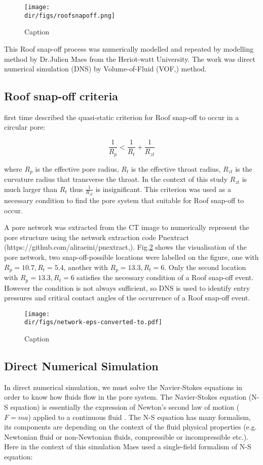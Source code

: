\begin{figure}
    \centering
    \texttt{[image: \\dir/figs/roofsnapoff.png]}
    \caption{Caption}   
    \label{roofsnapoff}
\end{figure}

This Roof snap-off process was numerically modelled and repeated by modelling method by Dr.Julien Maes from the Heriot-watt University. The work was direct numerical simulation (DNS) by Volume-of-Fluid (VOF,\citep{hirt1981volume}) method. 

\subsection{Roof snap-off criteria}
\citet{roof1970snap} first time described the quasi-static criterion for Roof snap-off to occur in a circular pore:

\begin{equation}
    \frac{1}{R_{p}} < \frac{1}{R_{t}} + \frac{1}{R_{zt}}
\end{equation}

where $R_p$ is the effective pore radius, $R_t$ is the effective throat radius, $R_{zt}$ is the curvature radius that transverse the throat. In the context of this study $R_{zt}$ is much larger than $R_t$ thus $\frac{1}{R_{zt}}$ is insignificant. This criterion was used as a necessary condition to find the pore system that suitable for Roof snap-off to occur.

A pore network was extracted from the CT image to numerically represent the pore structure using the network extraction code Pnextract (https://github.com/aliraeini/pnextract,\citet{dong2009pore,bultreys2018validation,raeini2017generalized}). Fig.\ref{network} shows the visualisation of the pore network, two snap-off-possible locations were labelled on the figure, one with $R_p=10.7, R_t=5.4$, another with $R_p=13.3,R_t=6$. Only the second location with $R_p=13.3,R_t=6$ satisfies the necessary condition of a Roof snap-off event. However the condition is not always sufficient, so DNS is used to identify entry pressures and critical contact angles of the occurrence of a Roof snap-off event.

\begin{figure}
    \centering
    \texttt{[image: \\dir/figs/network-eps-converted-to.pdf]}
    \caption{Caption}   
    \label{network}
\end{figure}

\subsection{Direct Numerical Simulation}
In direct numerical simulation, we must solve the Navier-Stokes equations in order to know how fluids flow in the pore system. The Navier-Stokes equation (N-S equation) is essentially the expression of Newton's second law of motion ($F=ma$) applied to a continuous fluid \citep{blunt2017multiphase}. The N-S equation has many formalism, its components are depending on the context of the fluid physical properties (e.g. Newtonian fluid or non-Newtonian fluids, compressible or incompressible etc.). Here in the context of this simulation Maes used a single-field formalism of N-S equation:

